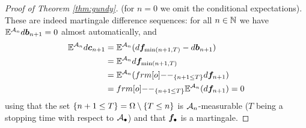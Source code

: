 \begin{proof}[Proof of Theorem \ref{thm:gundy}]
  (for $n = 0$ we omit the conditional expectations).
  These are indeed martingale difference sequences: for all $n \in \mathbb{N}$ we have $\mathbb{E}^{\mathcal{A}_{n}} d\bm{b}_{n+1} = 0$ almost automatically, and
  \begin{equation*}
    \begin{aligned}
      \E^{\mc{A}_{n}} d\mb{c}_{n+1}
      &= \E^{\mc{A}_{n}} (d\mb{f}_{\min(n+1,T)} - d\mb{b}_{n+1}) \\
      &= \E^{\mc{A}_{n}} d\mb{f}_{\min(n+1,T)} \\
      &= \E^{\mc{A}_{n}} (\1_{\{n+1 \leq T\}} d\mb{f}_{n+1}) \\
      &= \1_{\{n+1 \leq T\}}\E^{\mc{A}_{n}} (d\mb{f}_{n+1}) = 0
    \end{aligned}
  \end{equation*}
  using that the set $\{n+1 \leq T\} = \Omega \setminus \{T \leq n\}$ is $\mathcal{A}_{n}$-measurable ($T$ being a stopping time with respect to $\mathcal{A}_{\bullet}$) and that $\bm{f}_{\bullet}$ is a martingale.


\end{proof}
